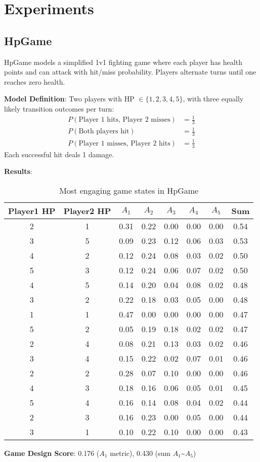 \documentclass{article}
\begin{document}
\section{Experiments}
\subsection{HpGame}

HpGame models a simplified 1v1 fighting game where each player has health points and can attack with hit/miss probability. Players alternate turns until one reaches zero health.

\textbf{Model Definition}: Two players with HP $\in \{1,2,3,4,5\}$, with three equally likely transition outcomes per turn:
\begin{align}
P(\text{Player 1 hits, Player 2 misses}) &= \frac{1}{3} \\
P(\text{Both players hit}) &= \frac{1}{3} \\
P(\text{Player 1 misses, Player 2 hits}) &= \frac{1}{3}
\end{align}
Each successful hit deals 1 damage.

\textbf{Results}:
\begin{table}[H]
\centering
\begin{tabular}{|c|c|c|c|c|c|c|c|}
\hline
Player1 HP & Player2 HP & $A_1$ & $A_2$ & $A_3$ & $A_4$ & $A_5$ & Sum \\
\hline
2 & 1 & 0.31 & 0.22 & 0.00 & 0.00 & 0.00 & 0.54 \\
3 & 5 & 0.09 & 0.23 & 0.12 & 0.06 & 0.03 & 0.53 \\
4 & 2 & 0.12 & 0.24 & 0.08 & 0.03 & 0.02 & 0.50 \\
5 & 3 & 0.12 & 0.24 & 0.06 & 0.07 & 0.02 & 0.50 \\
4 & 5 & 0.14 & 0.20 & 0.04 & 0.08 & 0.02 & 0.48 \\
3 & 2 & 0.22 & 0.18 & 0.03 & 0.05 & 0.00 & 0.48 \\
1 & 1 & 0.47 & 0.00 & 0.00 & 0.00 & 0.00 & 0.47 \\
5 & 2 & 0.05 & 0.19 & 0.18 & 0.02 & 0.02 & 0.47 \\
2 & 4 & 0.08 & 0.21 & 0.13 & 0.03 & 0.02 & 0.46 \\
3 & 4 & 0.15 & 0.22 & 0.02 & 0.07 & 0.01 & 0.46 \\
2 & 2 & 0.28 & 0.07 & 0.10 & 0.00 & 0.00 & 0.46 \\
4 & 3 & 0.18 & 0.16 & 0.06 & 0.05 & 0.01 & 0.45 \\
5 & 4 & 0.16 & 0.14 & 0.08 & 0.04 & 0.02 & 0.44 \\
2 & 3 & 0.16 & 0.23 & 0.00 & 0.05 & 0.00 & 0.44 \\
3 & 1 & 0.10 & 0.22 & 0.10 & 0.00 & 0.00 & 0.43 \\
\hline
\end{tabular}
\caption{Most engaging game states in HpGame}
\end{table}
\textbf{Game Design Score}: 0.176 ($A_1$ metric), 0.430 (sum $A_1$\textasciitilde$A_5$)
\end{document}

